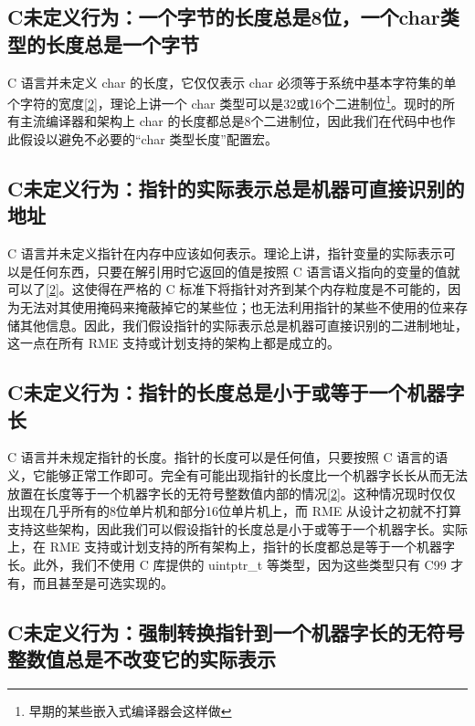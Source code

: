 \subsection{C未定义行为：一个字节的长度总是8位，一个char类型的长度总是一个字节}\label{subsec:9-char-size-eight-bits}

C 语言并未定义 char 的长度，它仅仅表示 char 必须等于系统中基本字符集的单个字符的宽度\hyperref[cite:9-2]{{[}2{]}}，理论上讲一个 char 类型可以是32或16个二进制位\footnote{早期的某些嵌入式编译器会这样做}。现时的所有主流编译器和架构上 char 的长度都总是8个二进制位，因此我们在代码中也作此假设以避免不必要的``char 类型长度''配置宏。

\subsection{C未定义行为：指针的实际表示总是机器可直接识别的地址}\label{subsec:9-pointer-representation}

C 语言并未定义指针在内存中应该如何表示。理论上讲，指针变量的实际表示可以是任何东西，只要在解引用时它返回的值是按照 C 语言语义指向的变量的值就可以了\hyperref[cite:9-2]{{[}2{]}}。这使得在严格的 C 标准下将指针对齐到某个内存粒度是不可能的，因为无法对其使用掩码来掩蔽掉它的某些位；也无法利用指针的某些不使用的位来存储其他信息。因此，我们假设指针的实际表示总是机器可直接识别的二进制地址，这一点在所有 RME 支持或计划支持的架构上都是成立的。

\subsection{C未定义行为：指针的长度总是小于或等于一个机器字长}\label{subsec:9-pointer-size-bound}

C 语言并未规定指针的长度。指针的长度可以是任何值，只要按照 C 语言的语义，它能够正常工作即可。完全有可能出现指针的长度比一个机器字长长从而无法放置在长度等于一个机器字长的无符号整数值内部的情况\hyperref[cite:9-2]{{[}2{]}}。这种情况现时仅仅出现在几乎所有的8位单片机和部分16位单片机上，而 RME 从设计之初就不打算支持这些架构，因此我们可以假设指针的长度总是小于或等于一个机器字长。实际上，在 RME 支持或计划支持的所有架构上，指针的长度都总是等于一个机器字长。此外，我们不使用 C 库提供的 uintptr\_t 等类型，因为这些类型只有 C99 才有，而且甚至是可选实现的。

\subsection{C未定义行为：强制转换指针到一个机器字长的无符号整数值总是不改变它的实际表示}\label{subsec:9-pointer-integer-cast}

